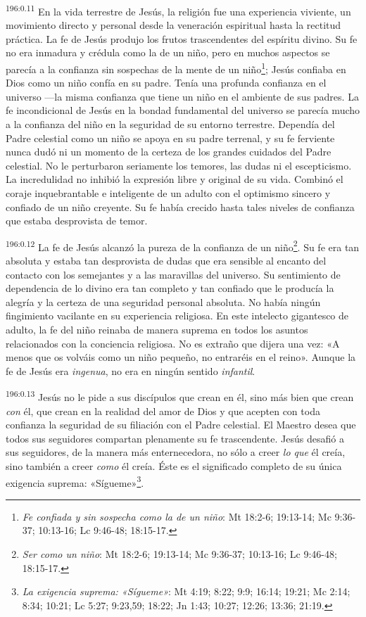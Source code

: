 \par 
\textsuperscript{196:0.11} En la vida terrestre de Jesús, la religión fue una experiencia viviente, un movimiento directo y personal desde la veneración espiritual hasta la rectitud práctica. La fe de Jesús produjo los frutos trascendentes del espíritu divino. Su fe no era inmadura y crédula como la de un niño, pero en muchos aspectos se parecía a la confianza sin sospechas de la mente de un niño\footnote{\textit{Fe confiada y sin sospecha como la de un niño}: Mt 18:2-6; 19:13-14; Mc 9:36-37; 10:13-16; Lc 9:46-48; 18:15-17.}; Jesús confiaba en Dios como un niño confía en su padre. Tenía una profunda confianza en el universo ---la misma confianza que tiene un niño en el ambiente de sus padres. La fe incondicional de Jesús en la bondad fundamental del universo se parecía mucho a la confianza del niño en la seguridad de su entorno terrestre. Dependía del Padre celestial como un niño se apoya en su padre terrenal, y su fe ferviente nunca dudó ni un momento de la certeza de los grandes cuidados del Padre celestial. No le perturbaron seriamente los temores, las dudas ni el escepticismo. La incredulidad no inhibió la expresión libre y original de su vida. Combinó el coraje inquebrantable e inteligente de un adulto con el optimismo sincero y confiado de un niño creyente. Su fe había crecido hasta tales niveles de confianza que estaba desprovista de temor.

\par 
\textsuperscript{196:0.12} La fe de Jesús alcanzó la pureza de la confianza de un niño\footnote{\textit{Ser como un niño}: Mt 18:2-6; 19:13-14; Mc 9:36-37; 10:13-16; Lc 9:46-48; 18:15-17.}. Su fe era tan absoluta y estaba tan desprovista de dudas que era sensible al encanto del contacto con los semejantes y a las maravillas del universo. Su sentimiento de dependencia de lo divino era tan completo y tan confiado que le producía la alegría y la certeza de una seguridad personal absoluta. No había ningún fingimiento vacilante en su experiencia religiosa. En este intelecto gigantesco de adulto, la fe del niño reinaba de manera suprema en todos los asuntos relacionados con la conciencia religiosa. No es extraño que dijera una vez: «A menos que os volváis como un niño pequeño, no entraréis en el reino». Aunque la fe de Jesús era \textit{ingenua}, no era en ningún sentido \textit{infantil}.

\par 
\textsuperscript{196:0.13} Jesús no le pide a sus discípulos que crean en él, sino más bien que crean \textit{con} él, que crean en la realidad del amor de Dios y que acepten con toda confianza la seguridad de su filiación con el Padre celestial. El Maestro desea que todos sus seguidores compartan plenamente su fe trascendente. Jesús desafió a sus seguidores, de la manera más enternecedora, no sólo a creer \textit{lo que} él creía, sino también a creer \textit{como} él creía. Éste es el significado completo de su única exigencia suprema: «Sígueme»\footnote{\textit{La exigencia suprema: «Sígueme»}: Mt 4:19; 8:22; 9:9; 16:14; 19:21; Mc 2:14; 8:34; 10:21; Lc 5:27; 9:23,59; 18:22; Jn 1:43; 10:27; 12:26; 13:36; 21:19.}.

